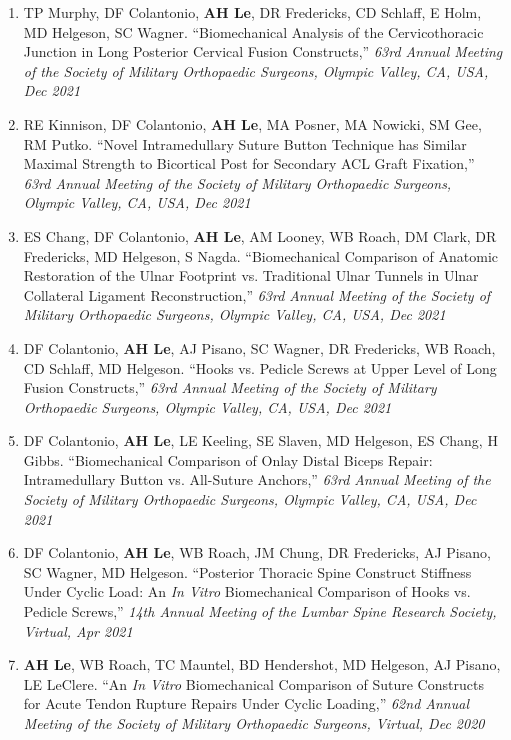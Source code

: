 \documentclass[10pt]{letter}
\begin{document}
\begin{justify}
\begin{enumerate}[leftmargin=*]
    \item TP Murphy, DF Colantonio, \textbf{AH Le}, DR Fredericks, CD Schlaff, E Holm, MD Helgeson, SC Wagner.
        ``Biomechanical Analysis of the Cervicothoracic Junction in Long Posterior Cervical Fusion Constructs,''
        \textit{63rd Annual Meeting of the Society of Military Orthopaedic Surgeons, Olympic Valley, CA, USA, Dec 2021}

    \item RE Kinnison, DF Colantonio, \textbf{AH Le}, MA Posner, MA Nowicki, SM Gee, RM Putko.
        ``Novel Intramedullary Suture Button Technique has Similar Maximal Strength to Bicortical Post for Secondary ACL Graft Fixation,''
        \textit{63rd Annual Meeting of the Society of Military Orthopaedic Surgeons, Olympic Valley, CA, USA, Dec 2021}

    \item ES Chang, DF Colantonio, \textbf{AH Le}, AM Looney, WB Roach, DM Clark, DR Fredericks, MD Helgeson, S Nagda.
        ``Biomechanical Comparison of Anatomic Restoration of the Ulnar Footprint vs. Traditional Ulnar Tunnels in Ulnar Collateral Ligament Reconstruction,''
        \textit{63rd Annual Meeting of the Society of Military Orthopaedic Surgeons, Olympic Valley, CA, USA, Dec 2021}
    
    \item DF Colantonio, \textbf{AH Le}, AJ Pisano, SC Wagner, DR Fredericks, WB Roach, CD Schlaff, MD Helgeson.
        ``Hooks vs. Pedicle Screws at Upper Level of Long Fusion Constructs,''
        \textit{63rd Annual Meeting of the Society of Military Orthopaedic Surgeons, Olympic Valley, CA, USA, Dec 2021}

    \item DF Colantonio, \textbf{AH Le}, LE Keeling, SE Slaven, MD Helgeson, ES Chang, H Gibbs.
        ``Biomechanical Comparison of Onlay Distal Biceps Repair: Intramedullary Button vs. All-Suture Anchors,''
        \textit{63rd Annual Meeting of the Society of Military Orthopaedic Surgeons, Olympic Valley, CA, USA, Dec 2021}

    \item DF Colantonio, \textbf{AH Le}, WB Roach, JM Chung, DR Fredericks, AJ Pisano, SC Wagner, MD Helgeson.
        ``Posterior Thoracic Spine Construct Stiffness Under Cyclic Load: An \textit{In Vitro} Biomechanical Comparison of Hooks vs. Pedicle Screws,''
        \textit{14th Annual Meeting of the Lumbar Spine Research Society, Virtual, Apr 2021}
    
    \item \textbf{AH Le}, WB Roach, TC Mauntel, BD Hendershot, MD Helgeson, AJ Pisano, LE LeClere.
        ``An \textit{In Vitro} Biomechanical Comparison of Suture Constructs for Acute Tendon Rupture Repairs Under Cyclic Loading,''
        \textit{62nd Annual Meeting of the Society of Military Orthopaedic Surgeons, Virtual, Dec 2020}
    

\end{enumerate}
\end{justify}
\end{document}
